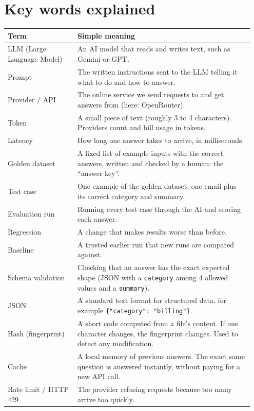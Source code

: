 \documentclass[11pt,a4paper]{article}
\newcommand{\code}[1]{\nolinkurl{#1}}
\begin{document}
\section{Key words explained}

\begin{longtable}{@{}p{0.27\linewidth}p{0.68\linewidth}@{}}
\toprule
\textbf{Term} & \textbf{Simple meaning} \\
\midrule
\endhead
LLM (Large Language Model) & An AI model that reads and writes text, such as Gemini or GPT. \\
Prompt & The written instructions sent to the LLM telling it what to do and how to answer. \\
Provider / API & The online service we send requests to and get answers from (here: OpenRouter). \\
Token & A small piece of text (roughly 3 to 4 characters). Providers count and bill usage in tokens. \\
Latency & How long one answer takes to arrive, in milliseconds. \\
Golden dataset & A fixed list of example inputs with the correct answers, written and checked by a human: the ``answer key''. \\
Test case & One example of the golden dataset: one email plus its correct category and summary. \\
Evaluation run & Running every test case through the AI and scoring each answer. \\
Regression & A change that makes results worse than before. \\
Baseline & A trusted earlier run that new runs are compared against. \\
Schema validation & Checking that an answer has the exact expected shape (JSON with a \code{category} among 4 allowed values and a \code{summary}). \\
JSON & A standard text format for structured data, for example \texttt{\{"category": "billing"\}}. \\
Hash (fingerprint) & A short code computed from a file's content. If one character changes, the fingerprint changes. Used to detect any modification. \\
Cache & A local memory of previous answers. The exact same question is answered instantly, without paying for a new API call. \\
Rate limit / HTTP 429 & The provider refusing requests because too many arrive too quickly. \\

\end{longtable}
\end{document}
